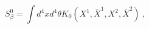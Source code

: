\begin{equation}
S^0_{\beta}=\int d^4xd^4\theta K_0(X^1,\bar{X}^1,X^2,\bar{X}^2) \ ,
\end{equation}

